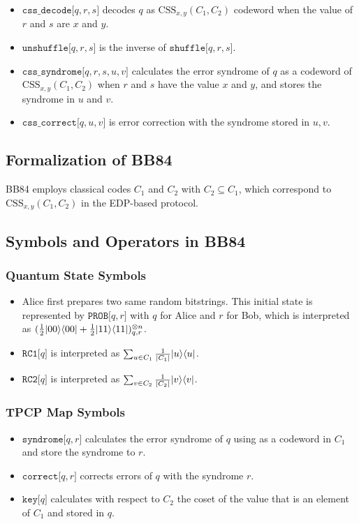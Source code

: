 \begin{itemize}
 \item $\texttt{css\_decode[}q,r,s\texttt{]}$ decodes $q$ as 
       $\mathrm{CSS}_{x,y}(C_1,C_2)$
       codeword when the value of $r$ and $s$ are $x$ and $y$.
 \item $\texttt{unshuffle[}q,r,s\texttt{]}$ is the inverse of
       $\texttt{shuffle[}q,r,s\texttt{]}$.
 \item $\texttt{css\_syndrome[}q,r,s,u,v\texttt{]}$ calculates
       the error syndrome of $q$ as a codeword of
       $\mathrm{CSS}_{x,y}(C_1,C_2)$ when
       $r$ and $s$ have the value $x$ and $y$, and stores the syndrome in
       $u$ and $v$.
 \item $\texttt{css\_correct[}q,u,v\texttt{]}$ is error correction
       with the syndrome stored in $u, v$.
\end{itemize}

\subsection{Formalization of BB84}
BB84 employs classical codes $C_1$ and $C_2$ with $C_2 \subseteq C_1$,
which correspond to $\mathrm{CSS}_{x,y}(C_1,C_2)$
in the EDP-based protocol.

\subsection{Symbols and Operators in BB84}
\subsubsection{Quantum State Symbols}
\begin{itemize}
 \item Alice first prepares two same random bitstrings. This
       initial state is represented by $\texttt{PROB[}q,r\texttt{]}$ with
       $q$ for Alice and $r$ for Bob, which is interpreted as
       $(\frac{1}{2}|00\rangle\langle 00| + 
       \frac{1}{2}|11\rangle\langle 11|)^{\otimes n}_{q,r}$.
 \item $\texttt{RC1[}q\texttt{]}$ is interpreted as  
       $\sum_{u\in C_1}\frac{1}{|C_1|}|u\rangle\langle u|$.
 \item $\texttt{RC2[}q\texttt{]}$ is interpreted as 
       $\sum_{v\in C_2}\frac{1}{|C_2|}|v\rangle\langle v|$.
\end{itemize}
\subsubsection{TPCP Map Symbols}
\begin{itemize}
 \item $\texttt{syndrome[}q,r\texttt{]}$ calculates the error syndrome of
       $q$ using as a codeword in $C_1$ and store the syndrome to
       $r$.
 \item $\texttt{correct[}q,r\texttt{]}$ corrects errors of $q$ with the
       syndrome $r$.
 \item $\texttt{key[}q\texttt{]}$ calculates with respect to $C_2$ the coset of the value
       that is an element of $C_1$ and stored in $q$.
\end{itemize}


